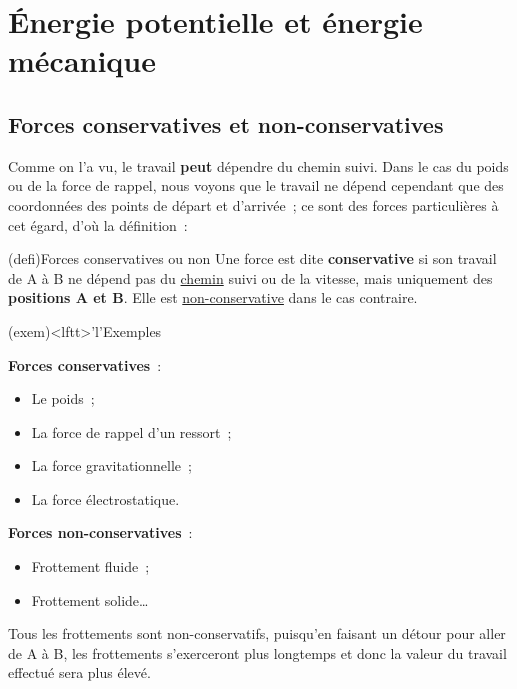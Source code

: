 \documentclass[../../main/main.tex]{subfiles}
\begin{document}
\section{Énergie potentielle et énergie mécanique}
\subsection{Forces conservatives et non-conservatives}
Comme on l'a vu, le travail \textbf{peut} dépendre du chemin suivi. Dans le cas
du poids ou de la force de rappel, nous voyons que le travail ne dépend
cependant que des coordonnées des points de départ et d'arrivée~; ce sont des
forces particulières à cet égard, d'où la définition~:

\begin{tcb*}(defi){Forces conservatives ou non}
	Une force est dite \textbf{conservative} si son travail de A à B ne dépend pas du
	\underline{chemin} suivi ou de la vitesse, mais uniquement des
	\textbf{positions A et B}. Elle est \underline{non-conservative} dans le cas
	contraire.
\end{tcb*}

\begin{tcb*}(exem)<lftt>'l'{Exemples}
	\begin{minipage}{0.45\linewidth}
		\textbf{Forces conservatives}~:
		\begin{itemize}
			\item Le poids~;
			\item La force de rappel d'un ressort~;
			\item La force gravitationnelle~;
			\item La force électrostatique.
		\end{itemize}
	\end{minipage}
	\hfill
	\begin{minipage}[b]{0.45\linewidth}
		\textbf{Forces non-conservatives}~:
		\begin{itemize}
			\item Frottement fluide~;
			\item Frottement solide…
		\end{itemize}
	\end{minipage} \bigbreak
	Tous les frottements sont non-conservatifs, puisqu'en faisant un détour
	pour aller de A à B, les frottements s'exerceront plus longtemps et donc
	la valeur du travail effectué sera plus élevé.
\end{tcb*}
\end{document}
